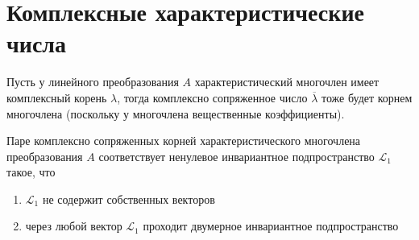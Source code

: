 \documentclass[11pt]{article}
\begin{document}
\section{Комплексные характеристические числа}

\begin{remark}
    Пусть у линейного преобразования $A$ характеристический многочлен имеет
    комплексный корень $\lambda$, тогда комплексно сопряженное число $\overline{\lambda}$
    тоже будет корнем многочлена (поскольку у многочлена вещественные коэффициенты).
\end{remark}

\begin{theorem}
    Паре комплексно сопряженных корней характеристического многочлена преобразования
    $A$ соответствует ненулевое инвариантное подпространство $\mathcal{L}_1$ такое, что 
    \begin{enumerate}
        \item $\mathcal{L}_1$ не содержит собственных векторов 
        \item через любой вектор $\mathcal{L}_1$ проходит двумерное инвариантное подпространство
    \end{enumerate}
\end{theorem}
\end{document}
